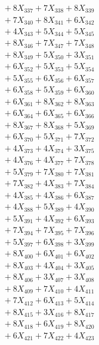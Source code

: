 \documentclass[a4paper,10pt]{article}
\begin{document}
{\begin{align}
&\;  + 8 X_{337} + 7 X_{338} + 8 X_{339} \\[0.5ex]\allowbreak
&\;  + 7 X_{340} + 8 X_{341} + 6 X_{342} \\[0.3ex]
&\;  + 4 X_{343} + 5 X_{344} + 5 X_{345} \\[0.3ex]
&\;  + 8 X_{346} + 7 X_{347} + 7 X_{348} \\[0.3ex]
&\;  + 8 X_{349} + 5 X_{350} + 3 X_{351} \\[0.3ex]
&\;  + 6 X_{352} + 5 X_{353} + 5 X_{354} \\[0.3ex]
&\;  + 5 X_{355} + 6 X_{356} + 6 X_{357} \\[0.3ex]
&\;  + 6 X_{358} + 5 X_{359} + 6 X_{360} \\[0.3ex]
&\;  + 6 X_{361} + 8 X_{362} + 8 X_{363} \\[0.3ex]
&\;  + 6 X_{364} + 6 X_{365} + 6 X_{366} \\[0.3ex]
&\;  + 8 X_{367} + 8 X_{368} + 5 X_{369} \\[0.5ex]\allowbreak
&\;  + 6 X_{370} + 5 X_{371} + 7 X_{372} \\[0.3ex]
&\;  + 4 X_{373} + 4 X_{374} + 3 X_{375} \\[0.3ex]
&\;  + 4 X_{376} + 4 X_{377} + 7 X_{378} \\[0.3ex]
&\;  + 5 X_{379} + 7 X_{380} + 7 X_{381} \\[0.3ex]
&\;  + 7 X_{382} + 4 X_{383} + 7 X_{384} \\[0.3ex]
&\;  + 4 X_{385} + 4 X_{386} + 6 X_{387} \\[0.3ex]
&\;  + 4 X_{388} + 5 X_{389} + 4 X_{390} \\[0.3ex]
&\;  + 5 X_{391} + 4 X_{392} + 6 X_{393} \\[0.3ex]
&\;  + 7 X_{394} + 7 X_{395} + 7 X_{396} \\[0.3ex]
&\;  + 5 X_{397} + 6 X_{398} + 3 X_{399} \\[0.5ex]\allowbreak
&\;  + 8 X_{400} + 6 X_{401} + 6 X_{402} \\[0.3ex]
&\;  + 8 X_{403} + 4 X_{404} + 3 X_{405} \\[0.3ex]
&\;  + 8 X_{406} + 3 X_{407} + 3 X_{408} \\[0.3ex]
&\;  + 8 X_{409} + 7 X_{410} + 4 X_{411} \\[0.3ex]
&\;  + 7 X_{412} + 6 X_{413} + 5 X_{414} \\[0.3ex]
&\;  + 8 X_{415} + 3 X_{416} + 8 X_{417} \\[0.3ex]
&\;  + 8 X_{418} + 6 X_{419} + 8 X_{420} \\[0.3ex]
&\;  + 6 X_{421} + 7 X_{422} + 4 X_{423} \\[0.3ex]

\end{align}}
\end{document}
